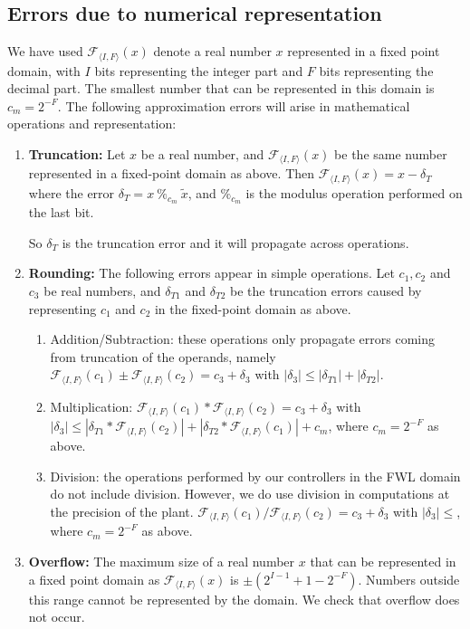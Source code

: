 \documentclass[runningheads,a4paper]{llncs}
\begin{document}
\subsection{Errors due to numerical representation} \label{appendix:numerical_errors}

We have  used $\mathcal{F}_{\langle I,F \rangle}(x)$ denote a real number $x$ represented in a fixed point domain, with $I$ bits representing the integer part and $F$ bits representing the decimal part. The smallest number that can be represented in this domain is $c_m=2^{-F}$.
The following approximation errors will arise in mathematical operations and representation:
\begin{enumerate}
\item {\bf Truncation:}
Let $x$ be a real number, and $\mathcal{F}_{\langle I,F \rangle}(x)$ be the same number represented in a fixed-point domain as above. 
Then $\mathcal{F}_{\langle I,F \rangle}(x) = x-\delta_T$ where the error $ \delta_T=x\ \%_{c_m}\ \tilde x$, and $\%_{c_m}$ is the modulus operation performed on the last bit.

So $\delta_T$ is the truncation error and it will propagate across operations.
\item {\bf Rounding:}
The following errors appear in simple operations. Let $c_1, c_2$ and $c_3$ be real numbers, and $\delta_{T1}$ and $\delta_{T2}$ be the truncation errors caused by representing $c_1$ and $c_2$ in the fixed-point domain as above.
\begin{enumerate}
\item Addition/Subtraction: these operations only propagate errors coming from truncation of the operands, namely 
$\mathcal{F}_{\langle I,F \rangle}(c_1) \pm \mathcal{F}_{\langle I,F \rangle}(c_2) = c_3 + \delta_3$ with $|\delta_3| \leq |\delta_{T1}| + |\delta_{T2}|$.
\item Multiplication: $\mathcal{F}_{\langle I,F \rangle}(c_1) * \mathcal{F}_{\langle I,F \rangle}(c_2) =  c_3 + \delta_3$ with $|\delta_3| \leq |\delta_{T1}*\mathcal{F}_{\langle I,F \rangle}(c_2)| + |\delta_{T2}*\mathcal{F}_{\langle I,F \rangle}(c_1)| + c_m$, where $c_m=2^{-F}$ as above.
\item Division: the operations performed by our controllers in the FWL domain do not include division. However, we do use division in computations at the precision of the plant. $\mathcal{F}_{\langle I,F \rangle}(c_1) / \mathcal{F}_{\langle I,F \rangle}(c_2) =  c_3 + \delta_3$ with $|\delta_3| \leq $, where $c_m=2^{-F}$ as above.
\end{enumerate}

\item {\bf Overflow:}
The maximum size of a real number $x$ that can be represented in a fixed point domain as $\mathcal{F}_{\langle I,F \rangle}(x)$ is $\pm (2^{I-1}+1-2^{-F})$. Numbers outside this range cannot be represented by the domain. We check that overflow does not occur.

\end{enumerate}
\end{document}
